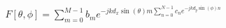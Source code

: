 \documentclass[preview]{standalone}
\begin{document}
\begin{align*}
F[\theta, \phi] = \sum_{m=0}^{M-1} b_m e^{-j k d_x \sin{(\theta) m} \sum_{n=0}^{N-1} c_n e^{-j k d_y \sin{(\phi) n}}}
\end{align*}
\end{document}
